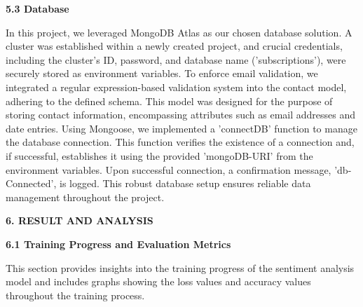 \documentclass[a4paper,12pt]{article}
\begin{document}
{{{  \begin{flushleft}
			\fontsize{13}{15}\selectfont\textbf{5.3 Database}
			\label{database}
		\end{flushleft}
  In this project, we leveraged MongoDB Atlas as our chosen database solution. A cluster was established within a newly created project, and crucial credentials, including the cluster's ID, password, and database name ('subscriptions'), were securely stored as environment variables. To enforce email validation, we integrated a regular expression-based validation system into the contact model, adhering to the defined schema. This model was designed for the purpose of storing contact information, encompassing attributes such as email addresses and date entries. Using Mongoose, we implemented a 'connectDB' function to manage the database connection. This function verifies the existence of a connection and, if successful, establishes it using the provided 'mongoDB-URI' from the environment variables. Upon successful connection, a confirmation message, 'db-Connected', is logged. This robust database setup ensures reliable data management throughout the project.















 
				    











   
		  
		\newpage
				
		\begin{flushleft}
			\fontsize{14}{16}\selectfont\textbf{6. RESULT AND ANALYSIS}
			\label{result}
		\end{flushleft}

  
  \begin{flushleft}
			\fontsize{13}{15}\selectfont\textbf{6.1 Training Progress and Evaluation Metrics}
			\phantomsection
			\label{train}
		\end{flushleft}



This section provides insights into the training progress of the sentiment analysis model and includes graphs showing the loss values and accuracy values throughout the training process.


}}}
\end{document}
